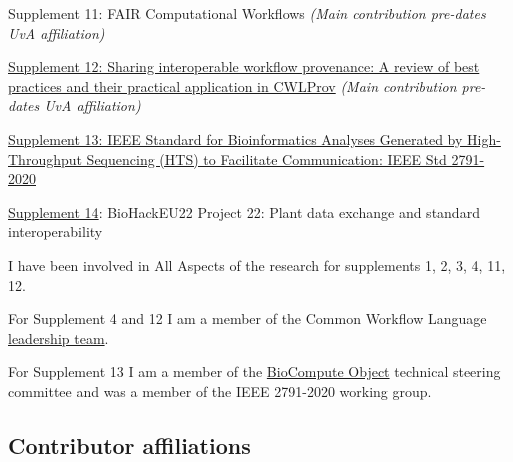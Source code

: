Supplement 11: FAIR Computational Workflows \cite{Goble 2020} \emph{(Main contribution pre-dates UvA
affiliation)} 

\href{https://doi.org/10.1093/gigascience/giz095}{Supplement 12: Sharing
interoperable workflow provenance: A review of best practices and their
practical application in CWLProv} \cite{ch5-68} \emph{(Main contribution pre-dates UvA
affiliation)} 

\href{https://www.research.manchester.ac.uk/portal/en/publications/ieee-2791(936de52b-ac53-4f0e-9927-77fd7073e88d).html}{Supplement
13: IEEE Standard for Bioinformatics Analyses Generated by
High-Throughput Sequencing (HTS) to Facilitate Communication: IEEE Std
2791-2020} \cite{ch5-64}

\href{https://doi.org/10.37044/osf.io/c724r}{Supplement 14}: BioHackEU22 Project 22: Plant data exchange and standard interoperability

I have been involved in All Aspects of the research for supplements 1, 2,
3, 4, 11, 12.

For Supplement 4 and 12 I am a member of the Common Workflow Language
\href{https://www.commonwl.org/governance/}{leadership team}.

For Supplement 13 I am a member of the
\href{https://www.biocomputeobject.org/}{BioCompute Object} technical
steering committee and was a member of the IEEE 2791-2020 working
group.

\subsection{Contributor affiliations}\label{ch10:contributor-affiliations}

